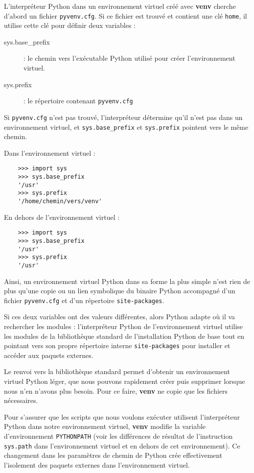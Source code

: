 L'interpréteur Python dans un environnement virtuel créé avec \textbf{venv} cherche d'abord un fichier \texttt{pyvenv.cfg}. Si ce fichier est trouvé et contient une clé \texttt{home}, il utilise cette clé pour définir deux variables :

\begin{description}
    \item[sys.base\_prefix] : le chemin vers l'exécutable Python utilisé pour créer l'environnement virtuel.
    \item[sys.prefix] : le répertoire contenant \texttt{pyvenv.cfg}
\end{description}

Si \texttt{pyvenv.cfg} n'est pas trouvé, l'interpréteur détermine qu'il n'est pas dans un environnement virtuel, et \texttt{sys.base\_prefix} et \texttt{sys.prefix} pointent vers le même chemin.

Dans l'environnement virtuel :
\begin{verbatim}
    >>> import sys
    >>> sys.base_prefix
    '/usr'
    >>> sys.prefix
    '/home/chemin/vers/venv'
\end{verbatim}

En dehors de l'environnement virtuel :
\begin{verbatim}
    >>> import sys
    >>> sys.base_prefix
    '/usr'
    >>> sys.prefix
    '/usr'
\end{verbatim}

Ainsi, un environnement virtuel Python dans sa forme la plus simple n'est rien de plus qu’une copie ou un lien symbolique du binaire Python accompagné d’un fichier \texttt{pyvenv.cfg} et d’un répertoire \texttt{site-packages}. 

Si ces deux variables ont des valeurs différentes, alors Python adapte où il va rechercher les modules : l’interpréteur Python de l'environnement virtuel utilise les modules de la bibliothèque standard de l'installation Python de base tout en pointant vers son propre répertoire interne \texttt{site-packages} pour installer et accéder aux paquets externes.

Le renvoi vers la bibliothèque standard permet d'obtenir un environnement virtuel Python léger, que nous pouvons rapidement créer puis supprimer lorsque nous n’en n'avons plus besoin. Pour ce faire, \textbf{venv} ne copie que les fichiers nécessaires.

Pour s’assurer que les scripts que nous voulons exécuter utilisent l’interpréteur Python dans notre environnement virtuel, \textbf{venv} modifie la variable d’environnement \texttt{PYTHONPATH} (voir les différences de résultat de l'instruction \texttt{sys.path} dans l'environnement virtuel et en dehors de cet environnement). Ce changement dans les paramètres de chemin de Python crée effectivement l’isolement des paquets externes dans l'environnement virtuel.

